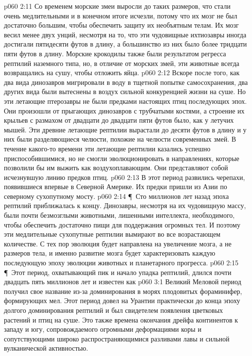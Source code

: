 \vs p060 2:11 Со временем морские змеи выросли до таких размеров, что стали очень медлительными и в конечном итоге исчезли, потому что их мозг не был достаточно большим, чтобы обеспечить защиту их необъятным телам. Их мозг весил менее двух унций, несмотря на то, что эти чудовищные ихтиозавры иногда достигали пятидесяти футов в длину, а большинство из них было более тридцати пяти футов в длину. Морские крокодилы также были результатом регресса рептилий наземного типа, но, в отличие от морских змей, эти животные всегда возвращались на сушу, чтобы отложить яйца.
\vs p060 2:12 Вскоре после того, как два вида динозавров мигрировали в воду в тщетной попытке самосохранения, два других вида были вытеснены в воздух сильной конкуренцией жизни на суше. Но эти летающие птерозавры не были предками настоящих птиц последующих эпох. Они произошли от прыгающих динозавров с трубчатыми костями, а строение их крыльев с размахом от двадцати до двадцати пяти футов было, как у летучих мышей. Эти древние летающие рептилии вырастали до десяти футов в длину и у них были разделяющиеся челюсти, похожие на челюсти современных змей. В течение какого\hyp{}то времени эти летающие рептилии казались успешно приспособившимися, но не смогли эволюционировать в направлениях, которые позволили бы им выжить как воздухоплавающим. Они представляют собой исчезнувшую линию предков птиц.
\vs p060 2:13 В этот период развились черепахи, появившиеся впервые в Северной Америке. Их предки пришли из Азии по северному сухопутному мосту.
\vs p060 2:14 \P\ Сто миллионов лет назад эпоха рептилий приближалась к концу. Динозавры, несмотря на их чудовищную массу, были почти безмозглыми животными, лишенными интеллекта, необходимого, чтобы обеспечить достаточно пищи для поддержания огромных тел. И поэтому эти медлительные сухопутные рептилии вымирают во все возрастающем количестве. С тех пор эволюция будет направлена на увеличение мозга, а не размеров тела, и именно развитие мозга будет характеризовать каждую последующую эпоху эволюции животных и планетарного прогресса.
\vs p060 2:15 \P\ Этот период, охватывающий пик и начало упадка рептилий, длился почти двадцать пять миллионов лет и известен как 
\vs p060 3:1 Великий Меловой период получил свое название из\hyp{}за доминирования в морях плодовитых фораминифер, формирующих мел. Этот период довел на Урантии практически до конца эпоху долгого доминирования рептилий и был свидетелем появления цветковых растений и птиц на суше. Это также времена окончания дрейфа континентов к западу и югу, сопровождаемого огромными деформациями коры и сопутствующими широко распространяющимися разливами лавы и сильной вулканической активностью.
